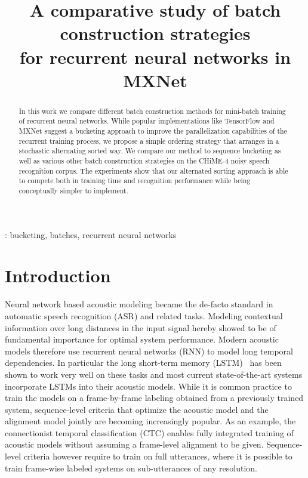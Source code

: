 \documentclass{article}
\title{A comparative study of batch construction strategies \\
	 for recurrent neural networks in MXNet}
\begin{document}
  \maketitle
  \begin{abstract}
  	 In this work we compare different batch construction methods for mini-batch training
  	 of recurrent neural networks. While popular implementations like TensorFlow and MXNet suggest 
  	 a bucketing approach to improve the parallelization capabilities of the recurrent training process, 
  	 we propose a simple ordering strategy that arranges in a stochastic alternating sorted way. We compare our method to sequence bucketing as well as various other
  	 batch construction strategies on the CHiME-4 noisy speech recognition corpus. The experiments
  	 show that our alternated sorting approach is able to compete both in training time and recognition performance while being conceptually simpler to implement. 
  \end{abstract}
  : bucketing, batches, recurrent neural networks

  \section{Introduction}
  	Neural network based acoustic modeling became the de-facto standard in automatic speech recognition (ASR)
  	and related tasks. Modeling contextual information over long distances in the input signal hereby showed to 
  	be of fundamental importance for optimal system performance. Modern acoustic models therefore use recurrent 
  	neural networks (RNN) to model long temporal dependencies. In particular the long short-term memory (LSTM)~\cite{hochreiter1997lstm}
  	has been shown to work very well on these tasks and most current state-of-the-art systems incorporate LSTMs
  	into their acoustic models. While it is common practice to train the
  	models on a frame-by-frame labeling obtained from a 
  	previously trained system, sequence-level criteria that optimize the acoustic model and the alignment model jointly
  	are becoming increasingly popular. As an example, the connectionist temporal classification (CTC) \cite{CTC}
  	enables fully integrated training of acoustic models without assuming a frame-level alignment to be given. Sequence-level
  	criteria however require to train on full utterances, where it is possible to train frame-wise labeled systems
  	on sub-utterances of any resolution.
  	
\end{document}
